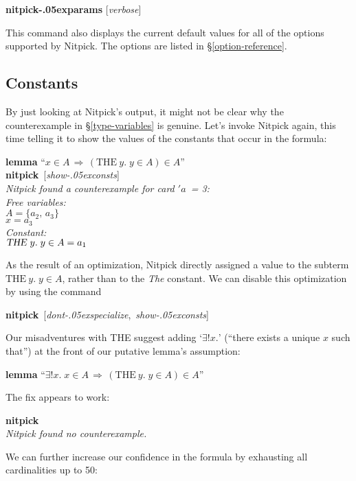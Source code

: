 \documentclass[a4paper,12pt]{article}
\renewcommand\_{\hbox{\textunderscore\kern-.05ex}}
\begin{document}
\prew
\textbf{nitpick\_params} [\textit{verbose}]
\postw

This command also displays the current default values for all of the options
supported by Nitpick. The options are listed in \S\ref{option-reference}.

\subsection{Constants}
\label{constants}

By just looking at Nitpick's output, it might not be clear why the
counterexample in \S\ref{type-variables} is genuine. Let's invoke Nitpick again,
this time telling it to show the values of the constants that occur in the
formula:

\prew
\textbf{lemma} ``$x \in A\,\Longrightarrow\, (\textrm{THE}~y.\;y \in A) \in A$'' \\
\textbf{nitpick}~[\textit{show\_consts}] \\[2\smallskipamount]
\slshape
Nitpick found a counterexample for \textit{card} $'a$~= 3: \\[2\smallskipamount]
\hbox{}\qquad Free variables: \nopagebreak \\
\hbox{}\qquad\qquad $A = \{a_2,\, a_3\}$ \\
\hbox{}\qquad\qquad $x = a_3$ \\
\hbox{}\qquad Constant: \nopagebreak \\
\hbox{}\qquad\qquad $\hbox{\slshape THE}~y.\;y \in A = a_1$
\postw

As the result of an optimization, Nitpick directly assigned a value to the
subterm $\textrm{THE}~y.\;y \in A$, rather than to the \textit{The} constant. We
can disable this optimization by using the command

\prew
\textbf{nitpick}~[\textit{dont\_specialize},\, \textit{show\_consts}]
\postw

Our misadventures with THE suggest adding `$\exists!x{.}$' (``there exists a
unique $x$ such that'') at the front of our putative lemma's assumption:

\prew
\textbf{lemma} ``$\exists {!}x.\; x \in A\,\Longrightarrow\, (\textrm{THE}~y.\;y \in A) \in A$''
\postw

The fix appears to work:

\prew
\textbf{nitpick} \\[2\smallskipamount]
\slshape Nitpick found no counterexample.
\postw

We can further increase our confidence in the formula by exhausting all
cardinalities up to 50:
\end{document}
